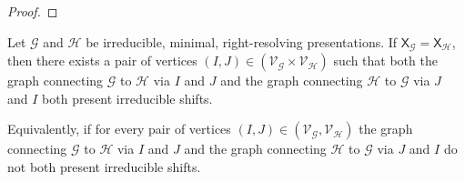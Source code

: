 \documentclass{article}
\newcommand{\Lc}{\mathcal{L}}  %
\newcommand{\Gc}{\mathcal{G}}  %
\newcommand{\Hc}{\mathcal{H}}  %
\newcommand{\Vc}{\mathcal{V}}
\newcommand{\Bc}{\mathcal{B}}
\newcommand{\Kc}{\mathcal{K}}
\newcommand{\shift}[1]{\mathsf{X}_{#1}}
\theoremstyle{definition}
\begin{document}
\begin{proof}
    \end{proof}

    \begin{theorem}
        Let \(\Gc\) and \(\Hc\) be irreducible, minimal, right-resolving presentations. 
        If \(\shift{\Gc} = \shift{\Hc}\), then there exists a pair
        of vertices \((I, J) \in (\Vc_\Gc \times \Vc_\Hc)\) such that both the graph connecting \(\Gc\) to \(\Hc\) via 
        \(I\) and \(J\) and the graph connecting \(\Hc\) to \(\Gc\) via \(J\) and \(I\) both 
        present irreducible shifts.

        Equivalently, if for every pair of vertices \((I, J) \in (\Vc_\Gc, \Vc_\Hc)\) 
        the graph connecting \(\Gc\) to \(\Hc\) via \(I\) and \(J\) 
        and the graph connecting \(\Hc\) to \(\Gc\) via \(J\) and \(I\)
        do not both present irreducible shifts.
    \end{theorem}
\end{document}
